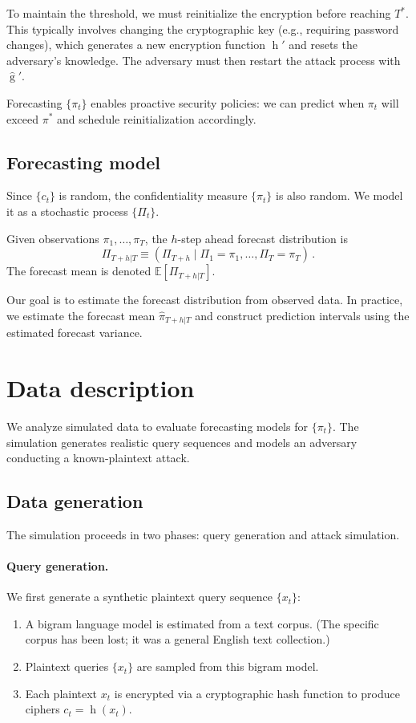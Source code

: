 \documentclass[final,11pt]{article}
\theoremstyle{plain}
\theoremstyle{remark}
\begin{document}
To maintain the threshold, we must reinitialize the encryption before
reaching $T^*$. This typically involves changing the cryptographic key
(e.g., requiring password changes), which generates a new encryption
function $\operatorname{h}'$ and resets the adversary's knowledge.
The adversary must then restart the attack process with
$\hat{\operatorname{g}}'$.

Forecasting $\{\pi_t\}$ enables proactive security policies: we can
predict when $\pi_t$ will exceed $\pi^*$ and schedule reinitialization
accordingly.

\hypertarget{forecasting-model}{%
\subsection{Forecasting model}\label{forecasting-model}}

Since $\{c_t\}$ is random, the confidentiality measure $\{\pi_t\}$ is
also random. We model it as a stochastic process $\{\Pi_t\}$.

Given observations $\pi_1,\ldots,\pi_T$, the $h$-step ahead forecast
distribution is
$$
\Pi_{T+h|T} \equiv (\Pi_{T+h} \mid \Pi_1 = \pi_1,\ldots,\Pi_T = \pi_T)\,.
$$
The forecast mean is denoted $\mathbb{E}[\Pi_{T+h|T}]$.

Our goal is to estimate the forecast distribution from observed data. In
practice, we estimate the forecast mean $\hat{\pi}_{T+h|T}$ and construct
prediction intervals using the estimated forecast variance.

\hypertarget{data-description}{%
\section{Data description}\label{data-description}}

We analyze simulated data to evaluate forecasting models for $\{\pi_t\}$.
The simulation generates realistic query sequences and models an adversary
conducting a known-plaintext attack.

\subsection{Data generation}

The simulation proceeds in two phases: query generation and attack simulation.

\paragraph{Query generation.}
We first generate a synthetic plaintext query sequence $\{x_t\}$:
\begin{enumerate}
\item A bigram language model is estimated from a text corpus. (The specific
corpus has been lost; it was a general English text collection.)
\item Plaintext queries $\{x_t\}$ are sampled from this bigram model.
\item Each plaintext $x_t$ is encrypted via a cryptographic hash function
to produce ciphers $c_t = \operatorname{h}(x_t)$.
\end{enumerate}
\end{document}
